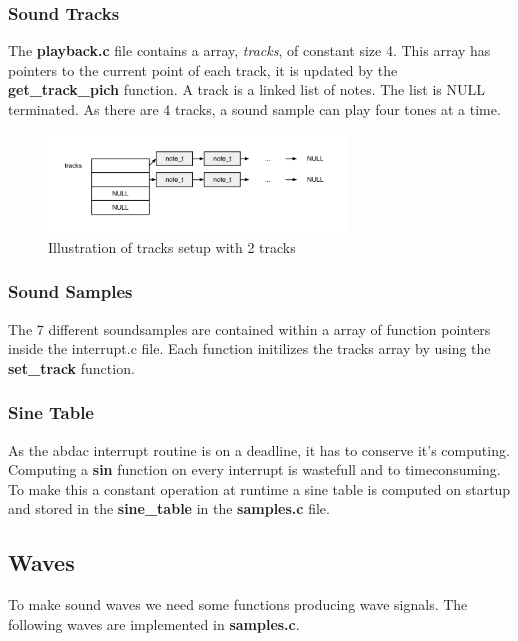 \subsubsection{Sound Tracks}
The \textbf{playback.c} file contains a array, \textit{tracks}, of constant size 4. This array has pointers to
the current point of each track, it is updated by the \textbf{get\_track\_pich} function. A track is a linked list of notes. The list is NULL terminated.
As there are 4 tracks, a sound sample can play four tones at a time.
\begin{figure}[h]
  \centerline{\includegraphics[width=300px]{tracks.png}}
  \caption{Illustration of tracks setup with 2 tracks}
\end{figure}

\subsubsection{Sound Samples}
The 7 different soundsamples are contained within a array of function pointers inside the interrupt.c file.
Each function initilizes the tracks array by using the \textbf{set\_track} function.

\subsubsection{Sine Table}
As the abdac interrupt routine is on a deadline, it has to conserve it's computing. Computing a \textbf{sin}
function on every interrupt is wastefull and to timeconsuming. To make this a constant operation at runtime
a sine table is computed on startup and stored in the \textbf{sine\_table} in the \textbf{samples.c} file.

\subsection{Waves}

To make sound waves we need some functions producing wave signals. The following waves are implemented
in \textbf{samples.c}.

